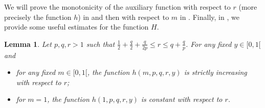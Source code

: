 \documentclass{amsart}
\newtheorem{lem}[thm]{Lemma}
\theoremstyle{definition}
\theoremstyle{remark}
\begin{document}
We will prove the monotonicity of the auxiliary function with respect to $r$ (more precisely the function $h$) in  and then with respect to $m$ in . Finally, in , we provide some useful estimates for the function $H$.
\begin{lem}
\label{prop-monotonia-r}
Let $p,q,r>1$ such that $\frac 12+\frac q2 +\frac q{2p}\le r \le q+\frac q p$.  For any fixed $y\in[0,1[$ and
\begin{itemize}
\item for any fixed $m\in[0,1[$, the function $h(m,p,q,r,y)$ is strictly increasing with respect to $r$;
\item for $m=1$, the function $h(1,p,q,r,y)$ is constant with respect to $r$. 
\end{itemize}
\end{lem}
\end{document}
